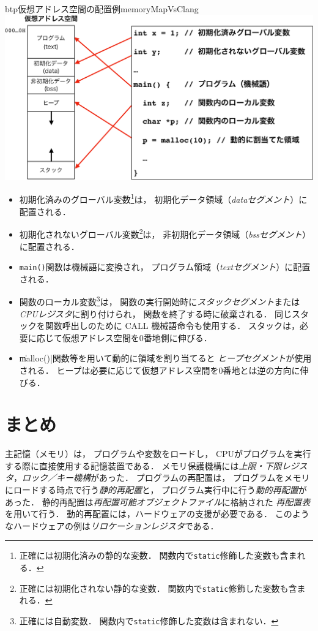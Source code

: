 \begin{myfig}{btp}{仮想アドレス空間の配置例}{memoryMapVsClang}
  \includegraphics[scale=0.6]{Fig/memoryMapVsClang-crop.pdf}
\end{myfig}

\begin{itemize}
\item 初期化済みのグローバル変数\footnote{
  正確には初期化済みの静的な変数．
  関数内で\texttt{static}修飾した変数も含まれる．}は，
  初期化データ領域（\emph{dataセグメント}）に配置される．
\item 初期化されないグローバル変数\footnote{
  正確には初期化されない静的な変数．
  関数内で\texttt{static}修飾した変数も含まれる．}は，
  非初期化データ領域（\emph{bssセグメント}）に配置される．
\item \texttt{main()}関数は機械語に変換され，
  プログラム領域（\emph{textセグメント}）に配置される．
\item 関数のローカル変数\footnote{
  正確には自動変数．
  関数内で\texttt{static}修飾した変数は含まれない．}は，
  関数の実行開始時に\emph{スタックセグメント}または
  \emph{CPUレジスタ}に割り付けられ，
  関数を終了する時に破棄される．
  同じスタックを関数呼出しのために CALL 機械語命令も使用する．
  スタックは，必要に応じて仮想アドレス空間を0番地側に伸びる．
\item \|malloc()|関数等を用いて動的に領域を割り当てると
  \emph{ヒープセグメント}が使用される．
  ヒープは必要に応じて仮想アドレス空間を0番地とは逆の方向に伸びる．
\end{itemize}



\section{まとめ}
主記憶（メモリ）は，
プログラムや変数をロードし，
CPUがプログラムを実行する際に直接使用する記憶装置である．
メモリ保護機構には\emph{上限・下限レジスタ}，\emph{ロック／キー機構}があった．
プログラムの再配置は，
プログラムをメモリにロードする時点で行う\emph{静的再配置}と，
プログラム実行中に行う\emph{動的再配置}があった．
静的再配置は\emph{再配置可能オブジェクトファイル}に格納された
\emph{再配置表}を用いて行う．
動的再配置には，ハードウェアの支援が必要である．
このようなハードウェアの例は\emph{リロケーションレジスタ}である．


